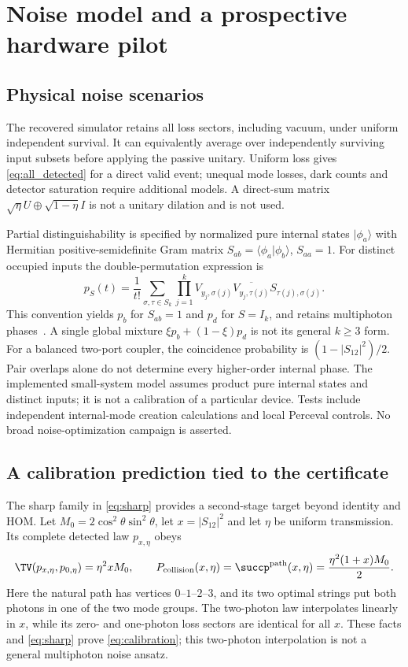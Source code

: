\section{Noise model and a prospective hardware pilot}\label{sec:pilot}
\subsection{Physical noise scenarios}
The recovered simulator retains all loss sectors, including vacuum, under uniform independent survival. It can equivalently average over independently surviving input subsets before applying the passive unitary. Uniform loss gives \cref{eq:all_detected} for a direct valid event; unequal mode losses, dark counts and detector saturation require additional models. A direct-sum matrix $\sqrt\eta U\oplus\sqrt{1-\eta}I$ is not a unitary dilation and is not used.

Partial distinguishability is specified by normalized pure internal states $|\phi_a\rangle$ with Hermitian positive-semidefinite Gram matrix $S_{ab}=\langle\phi_a|\phi_b\rangle$, $S_{aa}=1$. For distinct occupied inputs the double-permutation expression is
\begin{equation}
 p_S(t)=\frac1{t!}\sum_{\sigma,\tau\in S_k}
 \prod_{j=1}^k V_{y_j,\sigma(j)}\overline{V_{y_j,\tau(j)}}
 S_{\tau(j),\sigma(j)}.\label{eq:partial}
\end{equation}
This convention yields $p_b$ for $S_{ab}=1$ and $p_d$ for $S=I_k$, and retains multiphoton phases~\cite{tichy2015}. A single global mixture $\xi p_b+(1-\xi)p_d$ is not its general $k\ge3$ form. For a balanced two-port coupler, the coincidence probability is $(1-|S_{12}|^2)/2$. Pair overlaps alone do not determine every higher-order internal phase. The implemented small-system model assumes product pure internal states and distinct inputs; it is not a calibration of a particular device. Tests include independent internal-mode creation calculations and local Perceval controls. No broad noise-optimization campaign is asserted.

\subsection{A calibration prediction tied to the certificate}
The sharp family in \cref{eq:sharp} provides a second-stage target beyond identity and HOM. Let $M_0=2\cos^2\theta\sin^2\theta$, let $x=|S_{12}|^2$ and let $\eta$ be uniform transmission. Its complete detected law $p_{x,\eta}$ obeys
\begin{equation}
 \TV(p_{x,\eta},p_{0,\eta})=\eta^2 xM_0,\qquad
 P_{\rm collision}(x,\eta)=\succp^{\rm path}(x,\eta)
 =\frac{\eta^2(1+x)M_0}{2}.\label{eq:calibration}
\end{equation}
Here the natural path has vertices $0$--$1$--$2$--$3$, and its two optimal strings put both photons in one of the two mode groups. The two-photon law interpolates linearly in $x$, while its zero- and one-photon loss sectors are identical for all $x$. These facts and \cref{eq:sharp} prove \cref{eq:calibration}; this two-photon interpolation is not a general multiphoton noise ansatz.

